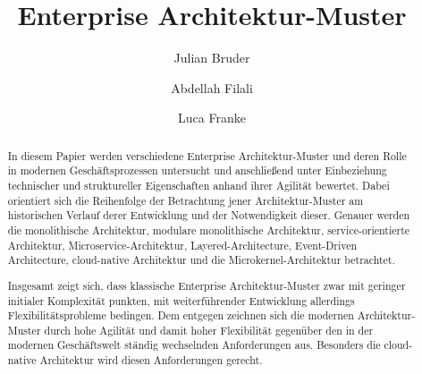 \documentclass[acmtog]{acmart}
\begin{document}
\title{Enterprise Architektur-Muster}

\author{Julian Bruder}
\author{Abdellah Filali}
\authornotemark[1]
\author{Luca Franke}
\authornotemark[1]
\renewcommand{\shortauthors}{Bruder, Filali, Franke}

\begin{abstract}
In diesem Papier werden verschiedene Enterprise Architektur-Muster und deren Rolle in modernen Geschäftsprozessen untersucht
und anschließend unter Einbeziehung technischer und struktureller Eigenschaften anhand ihrer Agilität bewertet.
Dabei orientiert sich die Reihenfolge der Betrachtung jener Architektur-Muster am historischen Verlauf derer Entwicklung und der Notwendigkeit dieser.
Genauer werden die monolithische Architektur, modulare monolithische Architektur, service-orientierte Architektur, Microservice-Architektur, Layered-Architecture,
Event-Driven Architecture, cloud-native Architektur und die Microkernel-Architektur betrachtet.

Insgesamt zeigt sich, dass klassische Enterprise Architektur-Muster zwar mit geringer initialer Komplexität punkten,
mit weiterführender Entwicklung allerdings Flexibilitätsprobleme bedingen.
Dem entgegen zeichnen sich die modernen Architektur-Muster durch hohe Agilität und damit hoher Flexibilität gegenüber den in der modernen Geschäftswelt ständig
wechselnden Anforderungen aus.
Besonders die cloud-native Architektur wird diesen Anforderungen gerecht.
\end{abstract}
\end{document}
